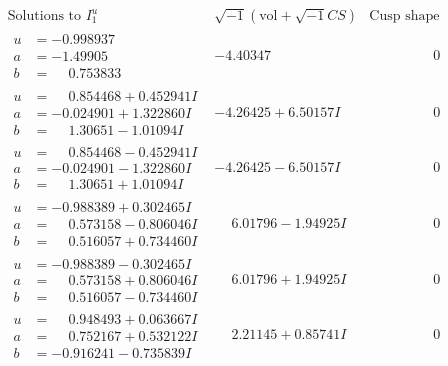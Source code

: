 \documentclass[1p]{elsarticle_modified}
\theoremstyle{definition}
\newcommand{\I}{\sqrt{-1}}
\begin{document}
$$\begin{array}{c|c|c}  
\text{Solutions to }I^u_{1}& \I (\text{vol} + \sqrt{-1}CS) & \text{Cusp shape}\\
 \hline 
\begin{aligned}
u &= -0.998937\phantom{ +0.000000I} \\
a &= -1.49905\phantom{ +0.000000I} \\
b &= \phantom{-}0.753833\phantom{ +0.000000I}\end{aligned}
 & -4.40347\phantom{ +0.000000I} & \phantom{-0.000000 } 0 \\ \hline\begin{aligned}
u &= \phantom{-}0.854468 + 0.452941 I \\
a &= -0.024901 + 1.322860 I \\
b &= \phantom{-}1.30651 - 1.01094 I\end{aligned}
 & -4.26425 + 6.50157 I & \phantom{-0.000000 } 0 \\ \hline\begin{aligned}
u &= \phantom{-}0.854468 - 0.452941 I \\
a &= -0.024901 - 1.322860 I \\
b &= \phantom{-}1.30651 + 1.01094 I\end{aligned}
 & -4.26425 - 6.50157 I & \phantom{-0.000000 } 0 \\ \hline\begin{aligned}
u &= -0.988389 + 0.302465 I \\
a &= \phantom{-}0.573158 - 0.806046 I \\
b &= \phantom{-}0.516057 + 0.734460 I\end{aligned}
 & \phantom{-}6.01796 - 1.94925 I & \phantom{-0.000000 } 0 \\ \hline\begin{aligned}
u &= -0.988389 - 0.302465 I \\
a &= \phantom{-}0.573158 + 0.806046 I \\
b &= \phantom{-}0.516057 - 0.734460 I\end{aligned}
 & \phantom{-}6.01796 + 1.94925 I & \phantom{-0.000000 } 0 \\ \hline\begin{aligned}
u &= \phantom{-}0.948493 + 0.063667 I \\
a &= \phantom{-}0.752167 + 0.532122 I \\
b &= -0.916241 - 0.735839 I\end{aligned}
 & \phantom{-}2.21145 + 0.85741 I & \phantom{-0.000000 } 0 \\ \hline\begin{aligned}

\end{aligned}
\end{array}$$
\end{document}
